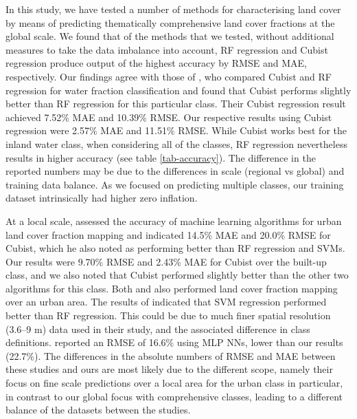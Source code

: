 \documentclass[review,authoryear,3p]{elsarticle}
\begin{document}
In this study, we have tested a number of methods for characterising land cover by means of predicting thematically comprehensive land cover fractions at the global scale.
We found that of the methods that we tested, without additional measures to take the data imbalance into account, \gls{RF} regression and Cubist regression produce output of the highest accuracy by \gls{RMSE} and \gls{MAE}, respectively.
Our findings agree with those of \citet{li_monitoring_2018}, who compared Cubist and \gls{RF} regression for water fraction classification and found that Cubist performs slightly better than \gls{RF} regression for this particular class.
Their Cubist regression result achieved 7.52\% \gls{MAE} and 10.39\% \gls{RMSE}.
Our respective results using Cubist regression were 2.57\% \gls{MAE} and 11.51\% \gls{RMSE}.
While Cubist works best for the inland water class, when considering all of the classes, \gls{RF} regression nevertheless results in higher accuracy (see table \ref{tab-accuracy}).
The difference in the reported numbers may be due to the differences in scale (regional vs global) and training data balance.
As we focused on predicting multiple classes, our training dataset intrinsically had higher zero inflation.

At a local scale, \citet{walton2008subpixelrf} assessed the accuracy of machine learning algorithms for urban land cover fraction mapping and indicated 14.5\% \gls{MAE} and 20.0\% \gls{RMSE} for Cubist, which he also noted as performing better than \gls{RF} regression and \glspl{SVM}.
Our results were 9.70\% \gls{RMSE} and 2.43\% \gls{MAE} for Cubist over the built-up class, and we also noted that Cubist performed slightly better than the other two algorithms for this class.
Both \citet{okujeni_comparison_2014} and \citet{foody1997fuzzynnet} also performed land cover fraction mapping over an urban area.
The results of \citet{okujeni_comparison_2014} indicated that \gls{SVM} regression performed better than \gls{RF} regression.
This could be due to much finer spatial resolution (3.6–9 m) data used in their study, and the associated difference in class definitions.
\citet{foody1997fuzzynnet} reported an \gls{RMSE} of 16.6\% using \gls{MLP} \glspl{NN}, lower than our results (22.7\%).
The differences in the absolute numbers of \gls{RMSE} and \gls{MAE} between these studies and ours are most likely due to the different scope, namely their focus on fine scale predictions over a local area for the urban class in particular, in contrast to our global focus with comprehensive classes, leading to a different balance of the datasets between the studies.
\end{document}
